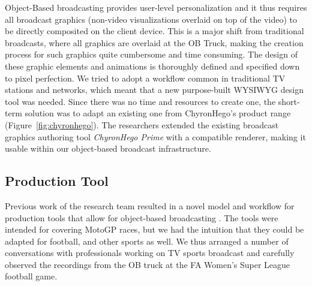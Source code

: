 \documentclass[sigchi-a, authorversion]{acmart}
\begin{document}
Object-Based broadcasting provides user-level personalization and it thus
requires all broadcast graphics (non-video visualizations overlaid on top of
the video) to be directly composited on the client device. This is a major shift
from traditional broadcasts, where all graphics are overlaid at the OB Truck,
making the creation process for such graphics quite cumbersome and time consuming.
The design of these graphic elements and animations is thoroughly defined and
specified down to pixel perfection. We tried to adopt a workflow common in traditional
TV stations and networks, which meant that a new purpose-built WYSIWYG design
tool was needed. Since there was no time and resources to create one, the
short-term solution was to adapt an existing one from ChyronHego's product range
(Figure~\ref{fig:chyronhego}). The researchers extended the existing
broadcast graphics authoring tool \emph{ChyronHego Prime} with a compatible renderer,
making it usable within our object-based broadcast infrastructure.

\subsection{Production Tool}

Previous work of the research team resulted in a novel model and workflow for
production tools that allow for object-based broadcasting \cite{Li:2018_TVX}.
The tools were intended for covering MotoGP races, but we had the intuition that
they could be adapted for football, and other sports as well. We thus arranged a number
of conversations with professionals working on TV sports broadcast and carefully
observed the recordings from the OB truck at the FA Women's Super League football
game.
\end{document}

